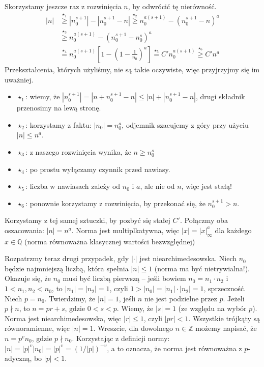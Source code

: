 \documentclass[a4paper,fleqn,9pt]{extarticle}
\newenvironment{itemx}{\begin{itemize}
	\setlength{\itemsep}{0pt}
	\setlength{\parskip}{0pt}
	\setlength{\parsep}{0pt}}
{\end{itemize}}
\begin{document}
Skorzystamy jeszcze raz z rozwinięcia $n$, by odwrócić tę nierówność.
\begin{align*}
|n| & \overset{\star_1}{\ge}
\left|n_0^{s+1}\right| - \left|n_0^{s+1} - n\right| \overset{\star_2}{\ge}
n_0^{a(s+1)} - \left(n_0^{s+1} - n\right)^a \\ & \overset{\star_3}{\ge} 
n_0^{a(s+1)} - \left(n_0^{s+1} - n_0^s\right)^a \\ & \overset{\star_4}{=}
n_0^{a(s+1)} \left[1 - \left( 1 - \frac{1}{n_0}\right)^a\right] \overset{\star_5}{=}
C' n_0^{a(s+1)} \overset{\star_6}{\ge}
C' n^a 
\end{align*}
Przekształcenia, których użyliśmy, nie są takie oczywiste, więc przyjrzyjmy się im uważniej.
\begin{itemx}
\item $\star_1$: wiemy, że $|n_0^{s+1}| = |n+n_0^{s+1}-n| \le |n| + |n_0^{s+1} - n|$, drugi składnik przenosimy na lewą stronę.
\item $\star_2$: korzystamy z faktu: $|n_0| = n_0^a$, odjemnik szacujemy z góry przy użyciu $| n| \le n^a$.
\item $\star_3$: z naszego rozwinięcia wynika, że $n \ge n_0^s$
\item $\star_4$: po prostu wyłączamy czynnik przed nawiasy.
\item $\star_5$: liczba w nawiasach zależy od $n_0$ i $a$, ale nie od $n$, więc jest stałą!
\item $\star_6$: ponownie korzystamy z rozwinięcia, by przekonać się, że $n_0^{s+1} > n$.
\end{itemx}

Korzystamy z tej samej sztuczki, by pozbyć się stałej $C'$. Połączmy oba oszacowania: $|n| = n^a$. Norma jest multiplkatywna, więc $|x| = |x|_\infty^a$ dla każdego $x\in\mathbb Q$ (norma równoważna klasycznej wartości bezwzględnej)

Rozpatrzmy teraz drugi przypadek, gdy $|\cdot|$ jest niearchimedesowska. Niech $n_0$ będzie najmniejszą liczbą, która spełnia $|n| \le 1$ (norma ma być nietrywialna!). Okazuje się, że $n_0$ musi być liczbą pierwszą -- jeśli bowiem $n_0 = n_1 \cdot n_2$ i $1 < n_1, n_2 < n_0$, to $|n_1| = |n_2| = 1$, czyli $1 > |n_0| = |n_1| \cdot |n_2| = 1$, sprzeczność. Niech $p = n_0$. Twierdzimy, że $|n| = 1$, jeśli $n$ nie jest podzielne przez $p$. Jeżeli $p\nmid n$, to $n = pr+s$, gdzie $0 < s < p$. Wiemy, że $|s| = 1$ (ze względu na wybór $p$). Norma jest niearchimedesowska, więc $|r| \le 1$, czyli $|pr| < 1$. Wszystkie trójkąty są równoramienne, więc $|n| = 1$. Wreszcie, dla dowolnego $n\in\mathbb Z$ możemy napisać, że $n = p^vn_0$, gdzie $p\nmid n_0$. Korzystając z definicji normy: $|n| = |p|^v |n_0| = |p|^v = (1/|p|)^{-v}$, a to oznacza, że norma jest równoważna z $p$-adyczną, bo $|p| < 1$.
\end{document}

